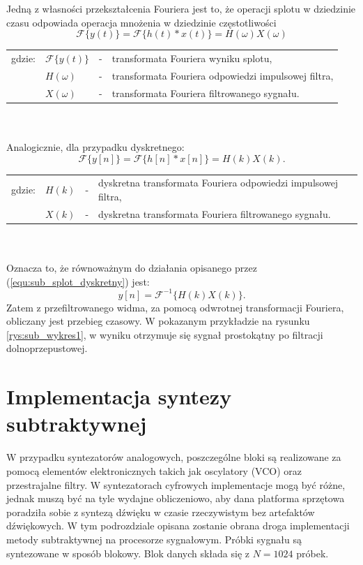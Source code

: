 Jedną z własności przekształcenia Fouriera jest to, że operacji splotu w dziedzinie czasu odpowiada operacja mnożenia w dziedzinie częstotliwości
\begin{equation} \label{equ:sub_splot_twierdzenie}
\mathcal{F}\{y(t)\} = \mathcal{F}\{h(t)*x(t)\} = H(\omega) X(\omega)
\end{equation}
\begin{tabular}{ l l l l}
	gdzie: & $\mathcal{F}\{y(t)\}$ &  - & transformata Fouriera wyniku splotu, \\
	&	$ H(\omega)$ & - &  transformata Fouriera odpowiedzi impulsowej filtra,\\
	&	$X(\omega)$ & - &  transformata Fouriera filtrowanego sygnału.\\
	
\end{tabular} \\ \\
Analogicznie, dla przypadku dyskretnego:
\begin{equation} \label{equ:sub_splot_twierdzenie_dyskretne}
\mathcal{F}\{y[n]\} = \mathcal{F}\{h[n]*x[n]\} = H(k) X(k).
\end{equation}
\begin{tabular}{ l l l l}
	gdzie: & $ H(k)$ & - &  dyskretna transformata Fouriera odpowiedzi impulsowej filtra,\\
	&	$X(k)$ & - &  dyskretna transformata Fouriera filtrowanego sygnału.\\
	
\end{tabular} \\ \\
Oznacza to, że równoważnym do działania opisanego przez (\ref{equ:sub_splot_dyskretny}) jest:
\begin{equation} \label{equ:sub_splot_dyskretny2}
y[n] = \mathcal{F}^{-1}\{ H(k) X(k)\}.
\end{equation}
Zatem z przefiltrowanego widma, za pomocą odwrotnej transformacji Fouriera, obliczany jest przebieg czasowy. W pokazanym przykładzie na rysunku \ref{rys:sub_wykres1}, w wyniku otrzymuje się sygnał prostokątny po filtracji dolnoprzepustowej.
\section{Implementacja syntezy subtraktywnej}
W przypadku syntezatorów analogowych, poszczególne bloki są realizowane za pomocą elementów elektronicznych takich jak oscylatory (VCO) oraz przestrajalne filtry. W syntezatorach cyfrowych implementacje mogą być różne, jednak muszą być na tyle wydajne obliczeniowo, aby dana platforma sprzętowa poradziła sobie z syntezą dźwięku w czasie rzeczywistym bez artefaktów dźwiękowych. W tym podrozdziale opisana zostanie obrana droga implementacji metody subtraktywnej na procesorze sygnałowym. 
Próbki sygnału są syntezowane w sposób blokowy. Blok danych składa się z $N=1024$ próbek.



